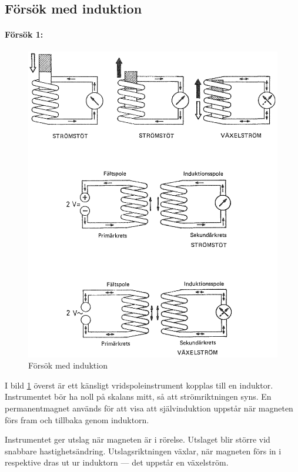 \subsection{Försök med induktion}

\paragraph{Försök 1:}

\begin{figure}
\includegraphics[width=\textwidth]{images/cropped_pdfs/bild_2_2-03.pdf}
\caption{Försök med induktion}
\label{fig:BildII2-3}
\end{figure}

I bild \ref{fig:BildII2-3} överst är ett känsligt vridspoleinstrument kopplas
till en induktor.
Instrumentet bör ha noll på skalans mitt, så att strömriktningen syns.
En permanentmagnet används för att visa att självinduktion uppstår när
magneten förs fram och tillbaka genom induktorn.

Instrumentet ger utslag när magneten är i rörelse. Utslaget blir större vid
snabbare hastighetsändring. Utslagsriktningen växlar, när magneten förs in i
respektive dras ut ur induktorn --- det uppstår en växelström.

